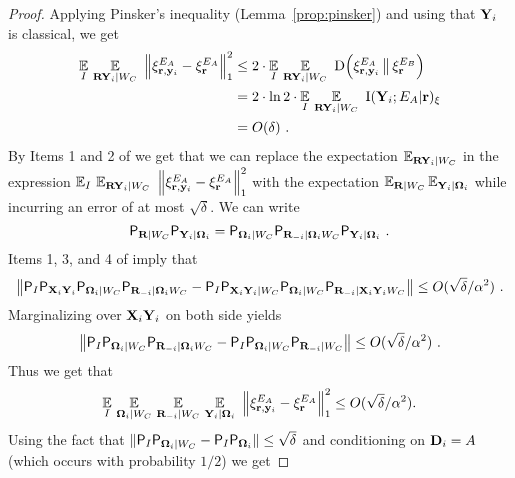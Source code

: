 \begin{proof}
Applying Pinsker's inequality (Lemma~\ref{prop:pinsker}) and using that $\bY_i$ is classical, we get
\begin{align*}
\Ex_I \, \Ex_{\bR \bY_i | W_C} \,\, \Big \| \xi^{E_A}_{\br,\by_i} -  \xi^{E_A}_{\br} \Big \|_1^2 &\leq 2 \cdot \Ex_I \,\Ex_{\bR \bY_i | W_C} \,\,  \D \Big(  \xi^{E_A}_{\br,\by_i} \, \big \|\, \xi^{E_B}_{\br} \Big )\\
&= 2\cdot \ln 2\cdot \Ex_I \, \Ex_{\bR \bY_i | W_C} \,\,  \I (\bY_i ; E_A | \br)_\xi \\
& = O(\delta)~.
\end{align*} 
By Items 1 and 2 of  we get that we can replace the expectation $\Ex_{\bR \bY_i | W_C} $ in the expression $\Ex_I \, \Ex_{\bR \bY_i | W_C} \,\, \Big \| \xi^{E_A}_{\br,\by_i} -  \xi^{E_A}_{\br} \Big \|_1^2$ with the expectation $\Ex_{\bR | W_C} \Ex_{\bY_i | \bOmega_i }$ while incurring an error of at most $\sqrt{\delta}$. 
We can write
\[
	\P_{\bR | W_C} \P_{\bY_i | \bOmega_i} = \P_{\bOmega_i | W_C} \P_{\bR_\mi | \bOmega_i  W_C} \P_{\bY_i | \bOmega_i}~.
\] 
Items 1, 3, and 4 of  imply that
\[
\left \| \P_I \P_{\bX_i \bY_i} \P_{\bOmega_i | W_C} \P_{\bR_\mi | \bOmega_i  W_C} - \P_I \P_{\bX_i \bY_i | W_C}  \P_{\bOmega_i | W_C} \P_{\bR_\mi | \bX_i \bY_i  W_C} \right \| \leq O(\sqrt{\delta}/\alpha^2)~.
\]
Marginalizing over $\bX_i \bY_i$ on both side yields
\[
\left \| \P_I \P_{\bOmega_i | W_C} \P_{\bR_\mi | \bOmega_i  W_C} - \P_I \P_{\bOmega_i | W_C} \P_{\bR_\mi | W_C} \right \| \leq O(\sqrt{\delta}/\alpha^2)~.
\]
Thus we get that 
\[
	\Ex_I \, \Ex_{\bOmega_i | W_C} \, \Ex_{\bR_\mi | W_C} \, \Ex_{\bY_i | \bOmega_i} \,\, \Big \| \xi^{E_A}_{\br,\by_i} -  \xi^{E_A}_{\br} \Big \|_1^2 \leq O(\sqrt{\delta}/\alpha^2).
\]
Using the fact that $\| \P_I \P_{\bOmega_i | W_C} - \P_I \P_{\bOmega_i} \| \leq \sqrt{\delta}$ and conditioning on $\bD_i = A$ (which occurs with probability $1/2$) we get

\end{proof}
